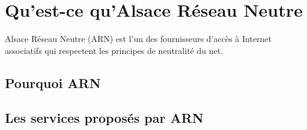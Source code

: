 \section{Qu'est-ce qu'Alsace Réseau Neutre}
Alsace Réseau Neutre (ARN) est l'un des fournisseurs d'accès à Internet associatifs qui respectent les principes de neutralité du net.
\subsection{Pourquoi ARN}
\subsection{Les services proposés par ARN}



